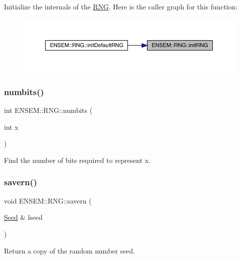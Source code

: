 Initialize the internals of the \mbox{\hyperlink{namespaceENSEM_1_1RNG}{R\+NG}}. Here is the caller graph for this function\+:\nopagebreak
\begin{figure}[H]
\begin{center}
\leavevmode
\includegraphics[width=350pt]{d8/d9c/namespaceENSEM_1_1RNG_a69ee665fc3157b2080c75a027343d449_icgraph}
\end{center}
\end{figure}
\mbox{\label{namespaceENSEM_1_1RNG_aa1f3f43467faf807cee97333f92173d4}} 
\subsubsection{\texorpdfstring{numbits()}{numbits()}}
{\footnotesize\ttfamily int E\+N\+S\+E\+M\+::\+R\+N\+G\+::numbits (\begin{DoxyParamCaption}\item[{int}]{x }\end{DoxyParamCaption})}



Find the number of bits required to represent x. 

\mbox{\label{namespaceENSEM_1_1RNG_a5e6a21d205da8a5f8bf3c4732ab5d358}} 
\subsubsection{\texorpdfstring{savern()}{savern()}}
{\footnotesize\ttfamily void E\+N\+S\+E\+M\+::\+R\+N\+G\+::savern (\begin{DoxyParamCaption}\item[{\mbox{\hyperlink{group__defs_ga8a5a983ab64ca8f6a5419885bacd4c40}{Seed}} \&}]{lseed }\end{DoxyParamCaption})}



Return a copy of the random number seed. 


